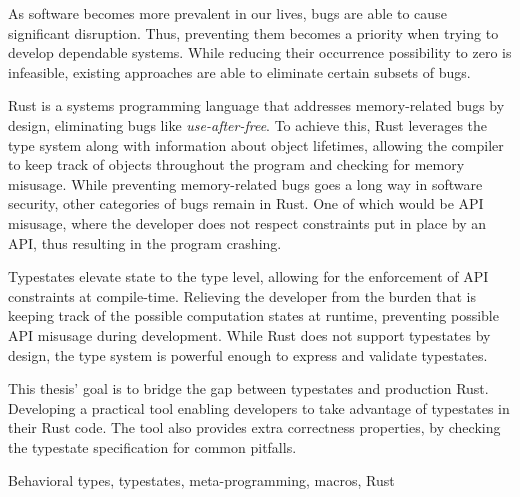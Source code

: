 
As software becomes more prevalent in our lives, bugs are able to cause significant disruption.
Thus, preventing them becomes a priority when trying to develop dependable systems.
While reducing their occurrence possibility to zero is infeasible,
existing approaches are able to eliminate certain subsets of bugs.

Rust is a systems programming language that addresses memory-related bugs by design,
eliminating bugs like \emph{use-after-free}.
To achieve this, Rust leverages the type system along with information about object lifetimes,
allowing the compiler to keep track of objects throughout the program and checking for memory misusage.
While preventing memory-related bugs goes a long way in software security, other categories of bugs remain in Rust.
One of which would be API misusage, where the developer does not respect constraints put in place by an API,
thus resulting in the program crashing.

Typestates elevate state to the type level, allowing for the enforcement of API constraints at compile-time.
Relieving the developer from the burden that is keeping track of the possible computation states at runtime,
preventing possible API misusage during development.
While Rust does not support typestates by design,
the type system is powerful enough to express and validate typestates.

This thesis' goal is to bridge the gap between typestates and production Rust.
Developing a practical tool enabling developers to take advantage of typestates in their Rust code.
The tool also provides extra correctness properties, by checking the typestate specification for common pitfalls.

\begin{keywords}
Behavioral types, typestates, meta-programming, macros, Rust
\end{keywords}
